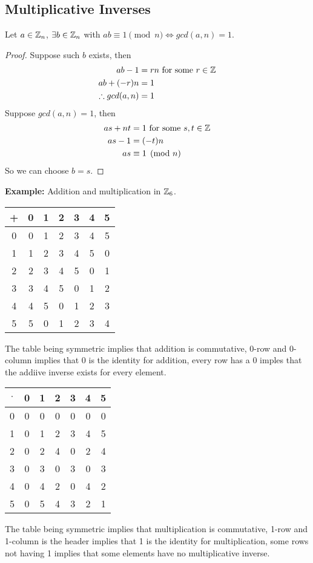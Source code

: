 \documentclass[openany]{report}
\begin{document}
\subsection{Multiplicative Inverses}
\begin{prop}
Let $a \in \mathbb{Z}_n$, $\exists b \in \mathbb{Z}_n$ with $ab\equiv 1 \pmod{n} \iff gcd(a,n) = 1$.
\end{prop}
\begin{proof}
    Suppose such $b$ exists, then
    \begin{align*}
        ab - 1 &= rn \text{ for some } r \in \mathbb{Z}\\
        ab + (-r)n &=1 \\
        \therefore gcd(a,n)&=1
    \end{align*}
    Suppose $gcd(a,n) = 1$, then
    \begin{align*}
        as + nt &= 1 \text{ for some } s,t \in \mathbb{Z}\\
        as - 1 &= (-t)n\\
        as &\equiv 1 \pmod{n}\\
    \end{align*}
    So we can choose $b = s$. 
\end{proof}
\textbf{Example:} Addition and multiplication in $\mathbb{Z}_6$.
\begin{center}
    \begin{tabular}{c|cccccc}
        + & 0 & 1 & 2 & 3 & 4 & 5\\
        \hline
        0 & 0 & 1 & 2 & 3 & 4 & 5\\
        1 & 1 & 2 & 3 & 4 & 5 & 0\\
        2 & 2 & 3 & 4 & 5 & 0 & 1\\
        3 & 3 & 4 & 5 & 0 & 1 & 2\\
        4 & 4 & 5 & 0 & 1 & 2 & 3\\
        5 & 5 & 0 & 1 & 2 & 3 & 4
    \end{tabular}  
\end{center}
The table being symmetric implies that addition is commutative, 0-row and 0-column implies that 0 is the identity for addition, every row has a 0 imples that the addiive inverse exists for every element.
\begin{center}
    \begin{tabular}{c|cccccc}
        $\cdot$ & 0 & 1 & 2 & 3 & 4 & 5\\
        \hline
        0 & 0 & 0 & 0 & 0 & 0 & 0\\
        1 & 0 & 1 & 2 & 3 & 4 & 5\\
        2 & 0 & 2 & 4 & 0 & 2 & 4\\
        3 & 0 & 3 & 0 & 3 & 0 & 3\\
        4 & 0 & 4 & 2 & 0 & 4 & 2\\
        5 & 0 & 5 & 4 & 3 & 2 & 1\\
    \end{tabular}
\end{center}
The table being symmetric implies that multiplication is commutative, 1-row and 1-column is the header implies that 1 is the identity for multiplication, some rows not having 1 implies that some elements have no multiplicative inverse.
\end{document}
